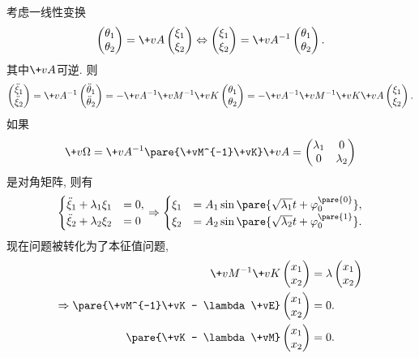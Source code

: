 \documentclass{ctexart}
\begin{document}
考虑一线性变换
\[ \begin{pmatrix}
    \theta_1 \\
    \theta_2
\end{pmatrix} = \+vA \begin{pmatrix}
    \xi_1 \\
    \xi_2
\end{pmatrix}\Leftrightarrow \begin{pmatrix}
    \xi_1 \\
    \xi_2
\end{pmatrix} = \+vA^{-1}\begin{pmatrix}
    \theta_1 \\
    \theta_2
\end{pmatrix}. \]
其中$\+vA$可逆. 则
\[ \begin{pmatrix}
    \ddot{\xi}_1 \\ \ddot{\xi}_2
\end{pmatrix} = \+vA^{-1} \begin{pmatrix}
    \ddot{\theta}_1 \\ \ddot{\theta}_2
\end{pmatrix} = -\+vA^{-1}\+vM^{-1}\+vK \begin{pmatrix}
    \theta_1\\\theta_2
\end{pmatrix} = -\+vA^{-1} \+vM^{-1}\+vK\+vA \begin{pmatrix}
    \xi_1 \\
    \xi_2
\end{pmatrix}. \]
如果
\[ \+v\Omega = \+vA^{-1}\pare{\+vM^{-1}\+vK}\+vA = \begin{pmatrix}
    \lambda_1 & 0 \\
    0 & \lambda_2
\end{pmatrix} \]
是对角矩阵, 则有
\[ \begin{cases}
    \ddot{\xi}_1 + \lambda_1 \xi_1 &= 0, \\
    \ddot{\xi}_2 + \lambda_2 \xi_2 &= 0
\end{cases}\Rightarrow \begin{cases}
    \xi_1 &= A_1 \sin\pare{\sqrt{\lambda_1} t + \varphi_0^{\pare{0}}}, \\
    \xi_2 &= A_2 \sin\pare{\sqrt{\lambda_2} t + \varphi_0^{\pare{1}}}.
\end{cases} \]
现在问题被转化为了本征值问题,
\begin{align*}
    \+vM^{-1}\+vK \begin{pmatrix}
    x_1 \\ x_2
\end{pmatrix} &= \lambda \begin{pmatrix}
    x_1 \\ x_2
\end{pmatrix} \\
\Rightarrow \pare{\+vM^{-1}\+vK - \lambda\+vE} \begin{pmatrix}
    x_1 \\ x_2
\end{pmatrix} &= 0. \\
\pare{\+vK - \lambda\+vM} \begin{pmatrix}
    x_1 \\ x_2
\end{pmatrix} &= 0.
\end{align*}
\end{document}
